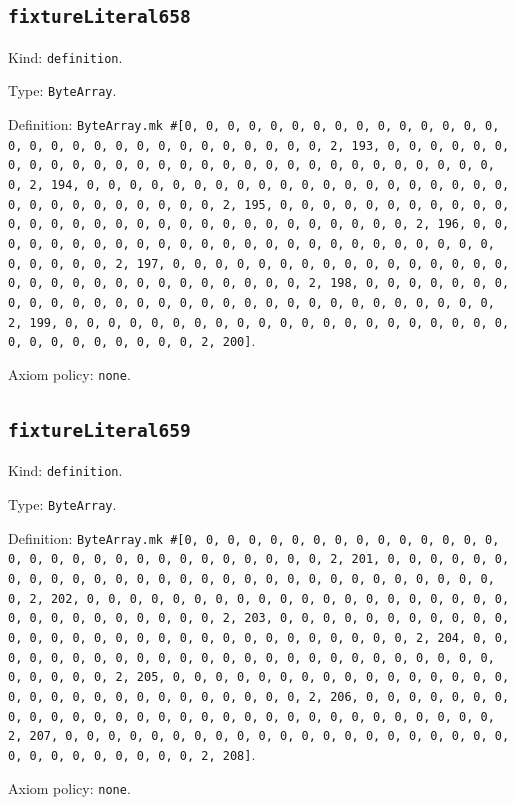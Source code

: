 \documentclass[11pt]{article}
\begin{document}
\subsection*{\texttt{fixtureLiteral658}}
\noindent Kind: \texttt{definition}.\par
\noindent Type: \texttt{ByteArray}.\par
\noindent Definition: \texttt{ByteArray.mk \#[0, 0, 0, 0, 0, 0, 0, 0, 0, 0, 0, 0, 0, 0, 0, 0, 0, 0, 0, 0, 0, 0, 0, 0, 0, 0, 0, 0, 0, 0, 2, 193, 0, 0, 0, 0, 0, 0, 0, 0, 0, 0, 0, 0, 0, 0, 0, 0, 0, 0, 0, 0, 0, 0, 0, 0, 0, 0, 0, 0, 0, 0, 2, 194, 0, 0, 0, 0, 0, 0, 0, 0, 0, 0, 0, 0, 0, 0, 0, 0, 0, 0, 0, 0, 0, 0, 0, 0, 0, 0, 0, 0, 0, 0, 2, 195, 0, 0, 0, 0, 0, 0, 0, 0, 0, 0, 0, 0, 0, 0, 0, 0, 0, 0, 0, 0, 0, 0, 0, 0, 0, 0, 0, 0, 0, 0, 2, 196, 0, 0, 0, 0, 0, 0, 0, 0, 0, 0, 0, 0, 0, 0, 0, 0, 0, 0, 0, 0, 0, 0, 0, 0, 0, 0, 0, 0, 0, 0, 2, 197, 0, 0, 0, 0, 0, 0, 0, 0, 0, 0, 0, 0, 0, 0, 0, 0, 0, 0, 0, 0, 0, 0, 0, 0, 0, 0, 0, 0, 0, 0, 2, 198, 0, 0, 0, 0, 0, 0, 0, 0, 0, 0, 0, 0, 0, 0, 0, 0, 0, 0, 0, 0, 0, 0, 0, 0, 0, 0, 0, 0, 0, 0, 2, 199, 0, 0, 0, 0, 0, 0, 0, 0, 0, 0, 0, 0, 0, 0, 0, 0, 0, 0, 0, 0, 0, 0, 0, 0, 0, 0, 0, 0, 0, 0, 2, 200]}.\par
\noindent Axiom policy: \texttt{none}.\par
\subsection*{\texttt{fixtureLiteral659}}
\noindent Kind: \texttt{definition}.\par
\noindent Type: \texttt{ByteArray}.\par
\noindent Definition: \texttt{ByteArray.mk \#[0, 0, 0, 0, 0, 0, 0, 0, 0, 0, 0, 0, 0, 0, 0, 0, 0, 0, 0, 0, 0, 0, 0, 0, 0, 0, 0, 0, 0, 0, 2, 201, 0, 0, 0, 0, 0, 0, 0, 0, 0, 0, 0, 0, 0, 0, 0, 0, 0, 0, 0, 0, 0, 0, 0, 0, 0, 0, 0, 0, 0, 0, 2, 202, 0, 0, 0, 0, 0, 0, 0, 0, 0, 0, 0, 0, 0, 0, 0, 0, 0, 0, 0, 0, 0, 0, 0, 0, 0, 0, 0, 0, 0, 0, 2, 203, 0, 0, 0, 0, 0, 0, 0, 0, 0, 0, 0, 0, 0, 0, 0, 0, 0, 0, 0, 0, 0, 0, 0, 0, 0, 0, 0, 0, 0, 0, 2, 204, 0, 0, 0, 0, 0, 0, 0, 0, 0, 0, 0, 0, 0, 0, 0, 0, 0, 0, 0, 0, 0, 0, 0, 0, 0, 0, 0, 0, 0, 0, 2, 205, 0, 0, 0, 0, 0, 0, 0, 0, 0, 0, 0, 0, 0, 0, 0, 0, 0, 0, 0, 0, 0, 0, 0, 0, 0, 0, 0, 0, 0, 0, 2, 206, 0, 0, 0, 0, 0, 0, 0, 0, 0, 0, 0, 0, 0, 0, 0, 0, 0, 0, 0, 0, 0, 0, 0, 0, 0, 0, 0, 0, 0, 0, 2, 207, 0, 0, 0, 0, 0, 0, 0, 0, 0, 0, 0, 0, 0, 0, 0, 0, 0, 0, 0, 0, 0, 0, 0, 0, 0, 0, 0, 0, 0, 0, 2, 208]}.\par
\noindent Axiom policy: \texttt{none}.\par
\end{document}
